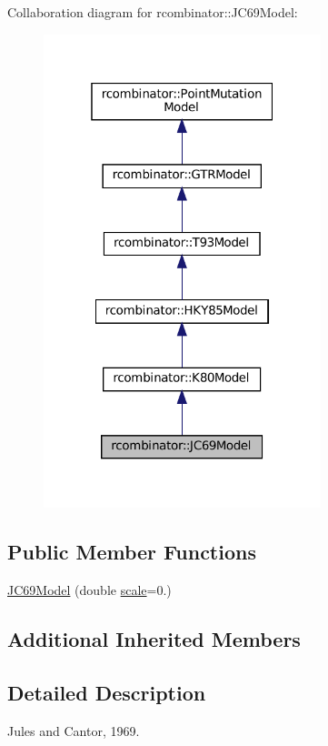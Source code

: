 Collaboration diagram for rcombinator\+:\+:J\+C69\+Model\+:\nopagebreak
\begin{figure}[H]
\begin{center}
\leavevmode
\includegraphics[width=229pt]{classrcombinator_1_1JC69Model__coll__graph}
\end{center}
\end{figure}
\subsection*{Public Member Functions}
\begin{DoxyCompactItemize}
\item 
\mbox{\hyperlink{classrcombinator_1_1JC69Model_a979834f85de8b2bb92d0cce5e64d6346}{J\+C69\+Model}} (double \mbox{\hyperlink{classrcombinator_1_1PointMutationModel_a328a30a438bb1b6a625faa3f714a85c8}{scale}}=0.)
\end{DoxyCompactItemize}
\subsection*{Additional Inherited Members}


\subsection{Detailed Description}
Jules and Cantor, 1969. 

